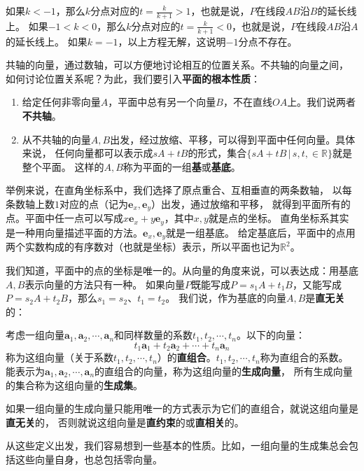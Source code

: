 \documentclass[12pt,UTF8,fontset=none]{ctexbook}
\begin{document}
如果$k<-1$，那么$k$分点对应的$t = \frac{k}{k+1} > 1$，也就是说，$P$在线段$AB$沿$B$的延长线上。
如果$-1<k<0$，那么$k$分点对应的$t = \frac{k}{k+1} < 0$，也就是说，$P$在线段$AB$沿$A$的延长线上。
如果$k=-1$，以上方程无解，这说明$-1$分点不存在。

共轴的向量，通过数轴，可以方便地讨论相互的位置关系。不共轴的向量之间，
如何讨论位置关系呢？为此，我们要引入\textbf{平面的根本性质}：
\begin{enumerate}
    \item 给定任何非零向量$A$，平面中总有另一个向量$B$，不在直线$OA$上。我们说两者\textbf{不共轴}。
    \item 从不共轴的向量$A, B$出发，经过放缩、平移，可以得到平面中任何向量。具体来说，
    任何向量都可以表示成$sA + tB$的形式，集合$\{sA + tB \,|\, s, t, \in\mathbb{R}\}$就是整个平面。
    这样的$A, B$称为平面的一组\textbf{基}或\textbf{基底}。
\end{enumerate}

举例来说，在直角坐标系中，我们选择了原点重合、互相垂直的两条数轴，
以每条数轴上数$1$对应的点（记为$\mathbf{e}_x, \mathbf{e}_y$）出发，通过放缩和平移，
就得到平面所有的点。平面中任一点可以写成$x\mathbf{e}_x + y\mathbf{e}_y$，其中$x,y$就是点的坐标。
直角坐标系其实是一种用向量描述平面的方法。$\mathbf{e}_x, \mathbf{e}_y$就是一组基底。
给定基底后，平面中的点用两个实数构成的有序数对（也就是坐标）表示，所以平面也记为$\mathbb{R}^2$。

我们知道，平面中的点的坐标是唯一的。从向量的角度来说，可以表达成：用基底$A, B$表示向量的方法只有一种。
如果向量$P$既能写成$P = s_1A + t_1B$，又能写成$P = s_2A + t_2B$，那么$s_1 = s_2$、$t_1 = t_2$。
我们说，作为基底的向量$A,B$是\textbf{直无关}的：
\begin{df}
    考虑一组向量$\mathbf{a}_1, \mathbf{a}_2, \cdots , \mathbf{a}_n$和同样数量的系数$t_1, t_2, \cdots, t_n$。以下的向量：
    $$ t_1\mathbf{a}_1 + t_2\mathbf{a}_2 + \cdots + t_n\mathbf{a}_n$$
    称为这组向量（关于系数$t_1, t_2, \cdots, t_n$）的\textbf{直组合}。$t_1, t_2, \cdots, t_n$称为直组合的系数。
    能表示为$\mathbf{a}_1, \mathbf{a}_2, \cdots , \mathbf{a}_n$的直组合的向量，称为这组向量的\textbf{生成向量}，
    所有生成向量的集合称为这组向量的\textbf{生成集}。

    如果一组向量的生成向量只能用唯一的方式表示为它们的直组合，就说这组向量是\textbf{直无关}的，
    否则就说这组向量是\textbf{直约束}的或\textbf{直相关}的。
\end{df}
从这些定义出发，我们容易想到一些基本的性质。比如，一组向量的生成集总会包括这些向量自身，也总包括零向量。
\end{document}
